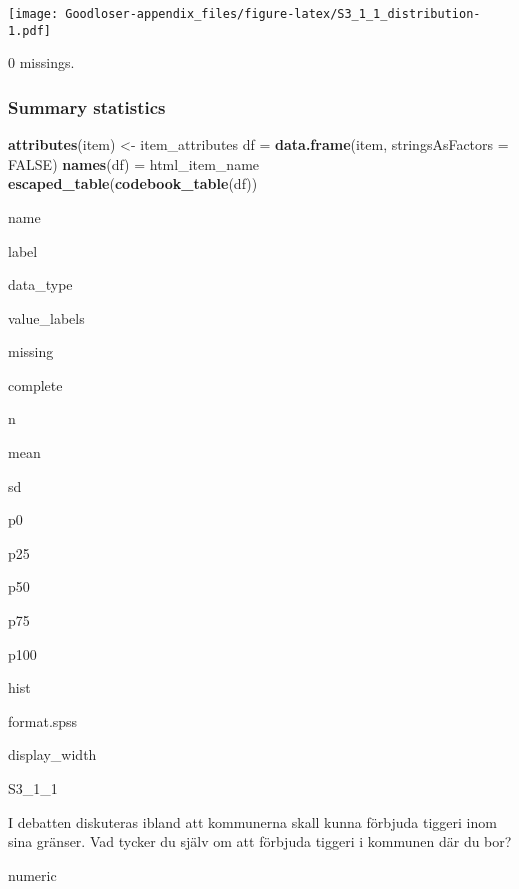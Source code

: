 \documentclass[]{book}
\newenvironment{Shaded}{\begin{snugshade}}{\end{snugshade}}
\newcommand{\KeywordTok}[1]{\textcolor[rgb]{0.13,0.29,0.53}{\textbf{#1}}}
\newcommand{\DataTypeTok}[1]{\textcolor[rgb]{0.13,0.29,0.53}{#1}}
\newcommand{\StringTok}[1]{\textcolor[rgb]{0.31,0.60,0.02}{#1}}
\newcommand{\OtherTok}[1]{\textcolor[rgb]{0.56,0.35,0.01}{#1}}
\newcommand{\OperatorTok}[1]{\textcolor[rgb]{0.81,0.36,0.00}{\textbf{#1}}}
\newcommand{\NormalTok}[1]{#1}
\begin{document}
\texttt{[image: Goodloser-appendix\_files/figure-latex/S3\_1\_1\_distribution-1.pdf]}

\begin{Shaded}
\end{Shaded}

0 missings.

\subsubsection{Summary statistics}\label{S3_1_1_summary}

\begin{Shaded}
\begin{Highlighting}[]
\KeywordTok{attributes}\NormalTok{(item) <-}\StringTok{ }\NormalTok{item_attributes}
\NormalTok{df =}\StringTok{ }\KeywordTok{data.frame}\NormalTok{(item, }\DataTypeTok{stringsAsFactors =} \OtherTok{FALSE}\NormalTok{)}
\KeywordTok{names}\NormalTok{(df) =}\StringTok{ }\NormalTok{html_item_name}
\KeywordTok{escaped_table}\NormalTok{(}\KeywordTok{codebook_table}\NormalTok{(df))}
\end{Highlighting}
\end{Shaded}

name

label

data\_type

value\_labels

missing

complete

n

mean

sd

p0

p25

p50

p75

p100

hist

format.spss

display\_width

S3\_1\_1

I debatten diskuteras ibland att kommunerna skall kunna förbjuda tiggeri
inom sina gränser. Vad tycker du själv om att förbjuda tiggeri i
kommunen där du bor?

numeric
\end{document}
